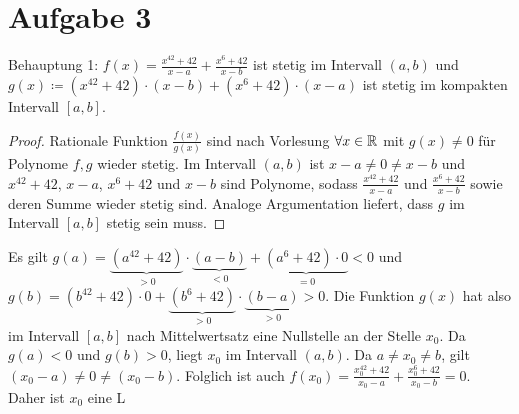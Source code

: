 \documentclass{article}
\begin{document}
    \section*{Aufgabe 3}
    Behauptung 1: $f(x) = \frac{x^{42} + 42}{x-a} + \frac{x^6 + 42}{x-b}$ ist stetig im Intervall $(a,b)$ und $g(x) \coloneqq (x^{42} + 42)\cdot (x - b) + (x^6 + 42)\cdot (x-a)$ ist stetig im kompakten Intervall $[a,b]$.
    \begin{proof}
        Rationale Funktion $\frac{f(x)}{g(x)}$ sind nach Vorlesung $\forall x\in \mathbb{R}$ mit $g(x) \neq 0$ für Polynome $f, g$ wieder stetig. Im Intervall $(a,b)$ ist $x - a \neq 0 \neq x-b$ und $x^{42} + 42$, $x-a$, $x^{6} + 42$ und $x-b$ sind Polynome, sodass $\frac{x^{42} + 42}{x-a}$ und  $\frac{x^6 + 42}{x-b}$ sowie deren Summe wieder stetig sind.
        Analoge Argumentation liefert, dass $g$ im Intervall $[a,b]$ stetig sein muss.
    \end{proof}
    \noindent Es gilt $g(a) = \underbrace{(a^{42} + 42)}_{> 0}\cdot \underbrace{(a - b)}_{< 0} + \underbrace{(a^6 + 42)\cdot 0}_{=0}  < 0$ und $g(b) = (b^{42} + 42)\cdot 0 + \underbrace{(b^6 + 42)}_{> 0}\cdot \underbrace{(b-a)}_{>0} > 0$. Die Funktion $g(x)$ hat also im Intervall $[a,b]$ nach Mittelwertsatz eine Nullstelle an der Stelle $x_0$. Da $g(a) < 0$ und $g(b) > 0$, liegt $x_0$ im Intervall $(a,b)$. Da $a \neq x_0 \neq b$, gilt  $(x_0-a) \neq 0 \neq (x_0-b)$. Folglich ist auch $f(x_0) = \frac{x_0^{42} + 42}{x_0-a} + \frac{x_0^6 + 42}{x_0-b} = 0$. Daher ist $x_0$ eine L 
\end{document}
